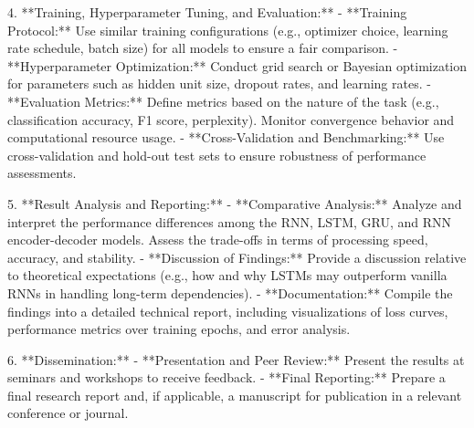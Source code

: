 \documentclass[12pt,a4paper]{article}
\begin{document}
4. **Training, Hyperparameter Tuning, and Evaluation:**
   - **Training Protocol:**  
     Use similar training configurations (e.g., optimizer choice, learning rate schedule, batch size) for all models to ensure a fair comparison.
   - **Hyperparameter Optimization:**  
     Conduct grid search or Bayesian optimization for parameters such as hidden unit size, dropout rates, and learning rates.
   - **Evaluation Metrics:**  
     Define metrics based on the nature of the task (e.g., classification accuracy, F1 score, perplexity). Monitor convergence behavior and computational resource usage.
   - **Cross-Validation and Benchmarking:**  
     Use cross-validation and hold-out test sets to ensure robustness of performance assessments.

5. **Result Analysis and Reporting:**
   - **Comparative Analysis:**  
     Analyze and interpret the performance differences among the RNN, LSTM, GRU, and RNN encoder-decoder models. Assess the trade-offs in terms of processing speed, accuracy, and stability.
   - **Discussion of Findings:**  
     Provide a discussion relative to theoretical expectations (e.g., how and why LSTMs may outperform vanilla RNNs in handling long-term dependencies).
   - **Documentation:**  
     Compile the findings into a detailed technical report, including visualizations of loss curves, performance metrics over training epochs, and error analysis.

6. **Dissemination:**
   - **Presentation and Peer Review:**  
     Present the results at seminars and workshops to receive feedback.
   - **Final Reporting:**  
     Prepare a final research report and, if applicable, a manuscript for publication in a relevant conference or journal.





\printbibliography
\end{document}
